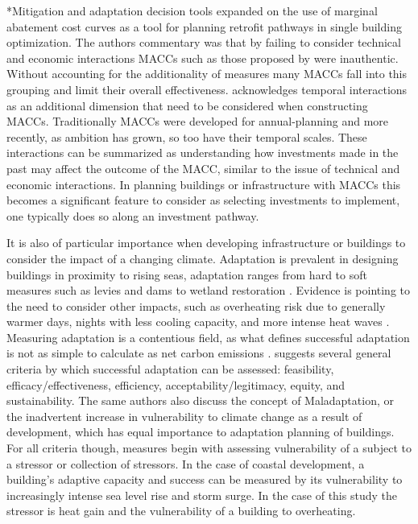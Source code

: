 \documentclass[twocolumn, a4paper,10pt]{article}
\makeatletter
\renewcommand\subsection{\@startsection{subsection}{1}{\z@}{\z@}{\z@}{\normalfont\normalsize\bfseries}}
\renewcommand\subsection{\@startsection{subsection}{1}{\z@}{\z@}{0.1pt}{\normalfont\normalsize\bfseries}}
\makeatother
\begin{document}
\subsection*{Mitigation and adaptation decision tools}
\citet{Rysanek MACC} expanded on the use of marginal abatement cost curves as a tool for planning retrofit pathways in single building optimization. The authors commentary was that by failing to consider technical and economic interactions MACCs such as those proposed by \citet{Mckinnsey} were inauthentic. Without accounting for the additionality of measures many MACCs fall into this grouping and limit their overall effectiveness. \citet{kesicki} acknowledges temporal interactions as an additional dimension that need to be considered when constructing MACCs. Traditionally MACCs were developed for annual-planning and more recently, as ambition has grown, so too have their temporal scales. These interactions can be summarized as understanding how investments made in the past may affect the outcome of the MACC, similar to the issue of technical and economic interactions. In planning buildings or infrastructure with MACCs this becomes a significant feature to consider as selecting investments to implement, one typically does so along an investment pathway. 

It is also of particular importance when developing infrastructure or buildings to consider the impact of a changing climate. Adaptation is prevalent in designing buildings in proximity to rising seas, adaptation ranges from hard to soft measures such as levies and dams to wetland restoration \citep{IPCC WGIIAR5 CH 15}. Evidence is pointing to the need to consider other impacts, such as overheating risk due to generally warmer days, nights with less cooling capacity, and more intense heat waves \citep{Lomas and Porrit; Rysanek ML Paper}. Measuring adaptation is a contentious field, as what defines successful adaptation is not as simple to calculate as net carbon emissions \citep{IPCC WGIIAR5 CH 14}. \citet{Brooks et al.} suggests several general criteria by which successful adaptation can be assessed: feasibility, efficacy/effectiveness, efficiency, acceptability/legitimacy, equity, and sustainability. The same authors also discuss the concept of Maladaptation, or the inadvertent increase in vulnerability to climate change as a result of development, which has equal importance to adaptation planning of buildings. For all criteria though, measures begin with assessing vulnerability of a subject to a stressor or collection of stressors. In the case of coastal development, a building's adaptive capacity and success can be measured by its vulnerability to increasingly intense sea level rise and storm surge. In the case of this study the stressor is heat gain and the vulnerability of a building to overheating. 
\end{document}
